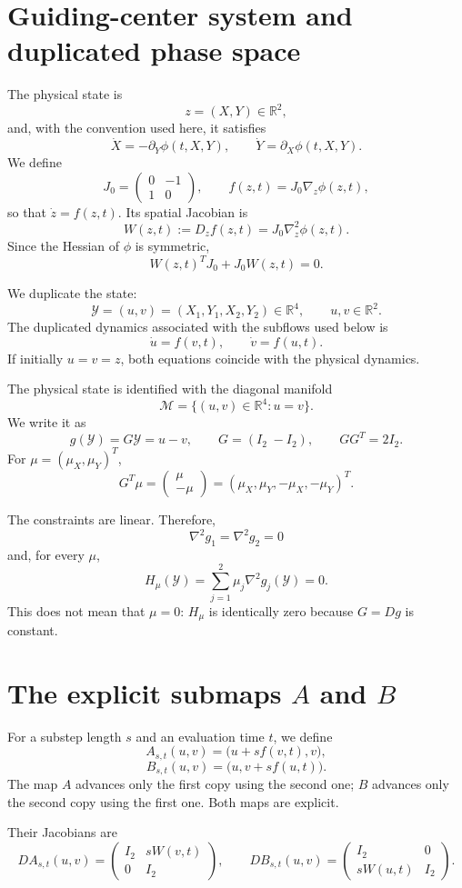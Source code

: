\documentclass[11pt,a4paper]{article}
\newcommand{\R}{\mathbb{R}}
\newcommand{\Id}{I}
\newcommand{\Y}{\mathcal{Y}}
\newcommand{\M}{\mathcal{M}}
\begin{document}
\section{Guiding-center system and duplicated phase space}

The physical state is
\[
 z=(X,Y)\in\R^2,
\]
and, with the convention used here, it satisfies
\[
 \dot X=-\partial_Y\phi(t,X,Y),
 \qquad
 \dot Y=\partial_X\phi(t,X,Y).
\]
We define
\[
 J_0=
 \begin{pmatrix}
  0&-1\\
  1&0
 \end{pmatrix},
 \qquad
 f(z,t)=J_0\nabla_z\phi(z,t),
\]
so that $\dot z=f(z,t)$. Its spatial Jacobian is
\[
 W(z,t):=D_zf(z,t)=J_0\nabla_z^2\phi(z,t).
\]
Since the Hessian of $\phi$ is symmetric,
\[
 W(z,t)^TJ_0+J_0W(z,t)=0. \tag{1}
\]

We duplicate the state:
\[
 \Y=(u,v)=(X_1,Y_1,X_2,Y_2)\in\R^4,
 \qquad u,v\in\R^2.
\]
The duplicated dynamics associated with the subflows used below is
\[
 \dot u=f(v,t),
 \qquad
 \dot v=f(u,t).
\]
If initially $u=v=z$, both equations coincide with the physical dynamics.

The physical state is identified with the diagonal manifold
\[
 \M=\{(u,v)\in\R^4:u=v\}.
\]
We write it as
\[
 g(\Y)=G\Y=u-v,
 \qquad
 G=(\Id_2\; -\Id_2),
 \qquad
 GG^T=2\Id_2.
\]
For $\mu=(\mu_X,\mu_Y)^T$,
\[
 G^T\mu=
 \begin{pmatrix}\mu\\-\mu\end{pmatrix}
 =(\mu_X,\mu_Y,-\mu_X,-\mu_Y)^T.
\]

The constraints are linear. Therefore,
\[
 \nabla^2g_1=\nabla^2g_2=0
\]
and, for every $\mu$,
\[
 \boxed{
 H_\mu(\Y)=\sum_{j=1}^2\mu_j\nabla^2g_j(\Y)=0.
 }
\]
This does not mean that $\mu=0$: $H_\mu$ is identically zero because $G=Dg$ is constant.

\section{The explicit submaps \texorpdfstring{$A$}{A} and \texorpdfstring{$B$}{B}}

For a substep length $s$ and an evaluation time $t$, we define
\[
 A_{s,t}(u,v)=\bigl(u+s f(v,t),v\bigr), \tag{2}
\]
\[
 B_{s,t}(u,v)=\bigl(u,v+s f(u,t)\bigr). \tag{3}
\]
The map $A$ advances only the first copy using the second one; $B$ advances only the
second copy using the first one. Both maps are explicit.

Their Jacobians are
\[
 DA_{s,t}(u,v)=
 \begin{pmatrix}
  \Id_2&sW(v,t)\\
  0&\Id_2
 \end{pmatrix},
 \qquad
 DB_{s,t}(u,v)=
 \begin{pmatrix}
  \Id_2&0\\
  sW(u,t)&\Id_2
 \end{pmatrix}. \tag{4}
\]
\end{document}
